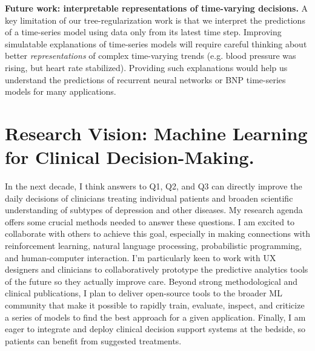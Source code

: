 \documentclass[11pt,letterpaper]{article}
\begin{document}
\textbf{Future work: interpretable representations of time-varying decisions.}
A key limitation of our tree-regularization work is that we interpret the predictions of a time-series model using data only from its latest time step. Improving simulatable explanations of time-series models will require careful thinking about better \emph{representations} of complex time-varying trends (e.g. blood pressure was rising, but heart rate stabilized). Providing such explanations would help us understand the predictions of recurrent neural networks or BNP time-series models
for many applications.

\section*{Research Vision: Machine Learning for Clinical Decision-Making.}

In the next decade, I think answers to Q1, Q2, and Q3 can directly improve the daily decisions of clinicians treating individual patients and broaden scientific understanding of subtypes of depression and other diseases.
My research agenda offers some crucial methods needed to answer these questions.
I am excited to collaborate with others to achieve this goal, especially in making connections with reinforcement learning, natural language processing, probabilistic programming, and human-computer interaction.
I'm particularly keen to work with UX designers and clinicians to collaboratively prototype the predictive analytics tools of the future so they actually improve care.
Beyond strong methodological and clinical publications, 
I plan to deliver open-source tools to the broader ML community that make it possible to rapidly train, evaluate, inspect, and criticize a series of models to find the best approach for a given application. Finally, I am eager to integrate and deploy clinical decision support systems at the bedside, so patients can benefit from suggested treatments.



\renewcommand{\url}[1]
{\ifx#1\else\href{#1}{[PDF]}\fi}
{\scriptsize
\setlength{\bibsep}{1pt}

}
\end{document}
